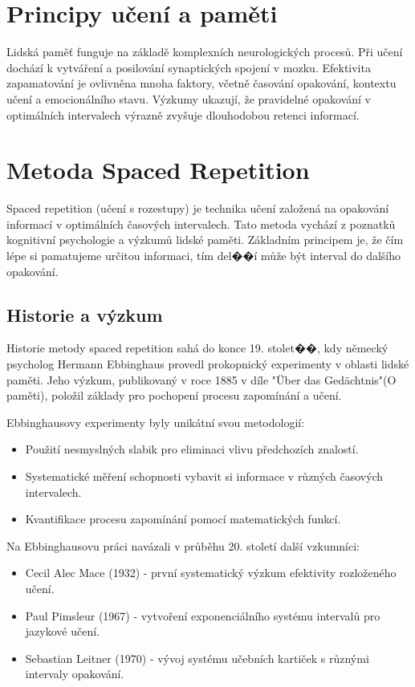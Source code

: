 \documentclass[12pt, a4paper, twoside, openright]{report}
\begin{document}
	\section{Principy učení a paměti}
	Lidská paměť funguje na základě komplexních neurologických procesů. Při učení dochází k vytváření a posilování synaptických spojení v mozku. Efektivita zapamatování je ovlivněna mnoha faktory, včetně časování opakování, kontextu učení a emocionálního stavu. Výzkumy ukazují, že pravidelné opakování v optimálních intervalech výrazně zvyšuje dlouhodobou retenci informací.

	\section{Metoda Spaced Repetition}
	Spaced repetition (učení s rozestupy) je technika učení založená na opakování informací v optimálních časových intervalech. Tato metoda vychází z poznatků kognitivní psychologie a výzkumů lidské paměti. Základním principem je, že čím lépe si pamatujeme určitou informaci, tím del��í může být interval do dalšího opakování.

	\subsection{Historie a výzkum}
	Historie metody spaced repetition sahá do konce 19. stolet��, kdy německý psycholog Hermann Ebbinghaus provedl prokopnický experimenty v oblasti lidské paměti. Jeho výzkum, publikovaný v roce 1885 v díle "Über das Gedächtnis"(O paměti), položil základy pro pochopení procesu zapomínání a učení.

	Ebbinghausovy experimenty byly unikátní svou metodologií:
	\begin{itemize}
		\item Použití nesmyslných slabik pro eliminaci vlivu předchozích znalostí.
		\item Systematické měření schopnosti vybavit si informace v různých časových intervalech.
		\item Kvantifikace procesu zapomínání pomocí matematických funkcí.
	\end{itemize}

	Na Ebbinghausovu práci navázali v průběhu 20. století další vzkumníci:
	\begin{itemize}
		\item Cecil Alec Mace (1932) - první systematický výzkum efektivity rozloženého učení.
		\item Paul Pimsleur (1967) - vytvoření exponenciálního systému intervalů pro jazykové učení.
		\item Sebastian Leitner (1970) - vývoj systému učebních kartiček s různými intervaly opakování.
	\end{itemize}
\end{document}
